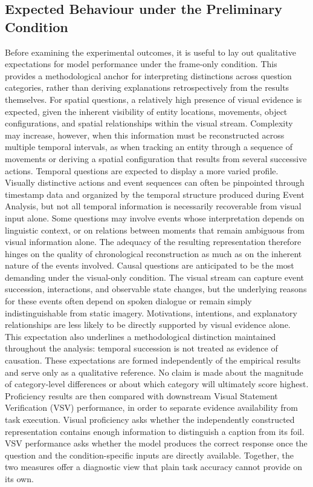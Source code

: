 \subsection*{Expected Behaviour under the Preliminary Condition}
\label{subsec:preliminary_expectations}
Before examining the experimental outcomes, it is useful to lay out qualitative expectations for model performance under the frame-only condition. This provides a methodological anchor for interpreting distinctions across question categories, rather than deriving explanations retrospectively from the results themselves.
For spatial questions, a relatively high presence of visual evidence is expected, given the inherent visibility of entity locations, movements, object configurations, and spatial relationships within the visual stream. Complexity may increase, however, when this information must be reconstructed across multiple temporal intervals, as when tracking an entity through a sequence of movements or deriving a spatial configuration that results from several successive actions.
Temporal questions are expected to display a more varied profile. Visually distinctive actions and event sequences can often be pinpointed through timestamp data and organized by the temporal structure produced during Event Analysis, but not all temporal information is necessarily recoverable from visual input alone. Some questions may involve events whose interpretation depends on linguistic context, or on relations between moments that remain ambiguous from visual information alone. The adequacy of the resulting representation therefore hinges on the quality of chronological reconstruction as much as on the inherent nature of the events involved.
Causal questions are anticipated to be the most demanding under the visual-only condition. The visual stream can capture event succession, interactions, and observable state changes, but the underlying reasons for these events often depend on spoken dialogue or remain simply indistinguishable from static imagery. Motivations, intentions, and explanatory relationships are less likely to be directly supported by visual evidence alone. This expectation also underlines a methodological distinction maintained throughout the analysis: temporal succession is not treated as evidence of causation.
These expectations are formed independently of the empirical results and serve only as a qualitative reference. No claim is made about the magnitude of category-level differences or about which category will ultimately score highest.
Proficiency results are then compared with downstream Visual Statement Verification (VSV) performance, in order to separate evidence availability from task execution. Visual proficiency asks whether the independently constructed representation contains enough information to distinguish a caption from its foil. VSV performance asks whether the model produces the correct response once the question and the condition-specific inputs are directly available. Together, the two measures offer a diagnostic view that plain task accuracy cannot provide on its own.
